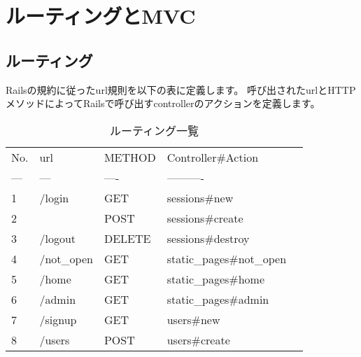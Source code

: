 \section{ルーティングとMVC}
\subsection{ルーティング}
Railsの規約に従ったurl規則を以下の表に定義します。
呼び出されたurlとHTTPメソッドによってRailsで呼び出すcontrollerのアクションを定義します。

\begin{table}[]
\centering
\caption{ルーティング一覧}
\label{my-label}
\begin{tabular}{lllll}
\cline{1-4}
\multicolumn{1}{|l|}{No.} & \multicolumn{1}{l|}{url}                 & \multicolumn{1}{l|}{METHOD} & \multicolumn{1}{l|}{Controller\#Action}       &  \\ \cline{1-4}
\multicolumn{1}{|l|}{---} & \multicolumn{1}{l|}{---}                 & \multicolumn{1}{l|}{----}   & \multicolumn{1}{l|}{----------}               &  \\ \cline{1-4}
\multicolumn{1}{|l|}{1}   & \multicolumn{1}{l|}{/login}              & \multicolumn{1}{l|}{GET}    & \multicolumn{1}{l|}{sessions\#new}            &  \\ \cline{1-4}
\multicolumn{1}{|l|}{2}   & \multicolumn{1}{l|}{}                    & \multicolumn{1}{l|}{POST}   & \multicolumn{1}{l|}{sessions\#create}         &  \\ \cline{1-4}
\multicolumn{1}{|l|}{3}   & \multicolumn{1}{l|}{/logout}             & \multicolumn{1}{l|}{DELETE} & \multicolumn{1}{l|}{sessions\#destroy}        &  \\ \cline{1-4}
\multicolumn{1}{|l|}{4}   & \multicolumn{1}{l|}{/not\_open}          & \multicolumn{1}{l|}{GET}    & \multicolumn{1}{l|}{static\_pages\#not\_open} &  \\ \cline{1-4}
\multicolumn{1}{|l|}{5}   & \multicolumn{1}{l|}{/home}               & \multicolumn{1}{l|}{GET}    & \multicolumn{1}{l|}{static\_pages\#home}      &  \\ \cline{1-4}
\multicolumn{1}{|l|}{6}   & \multicolumn{1}{l|}{/admin}              & \multicolumn{1}{l|}{GET}    & \multicolumn{1}{l|}{static\_pages\#admin}     &  \\ \cline{1-4}
\multicolumn{1}{|l|}{7}   & \multicolumn{1}{l|}{/signup}             & \multicolumn{1}{l|}{GET}    & \multicolumn{1}{l|}{users\#new}               &  \\ \cline{1-4}
\multicolumn{1}{|l|}{8}   & \multicolumn{1}{l|}{/users}              & \multicolumn{1}{l|}{POST}   & \multicolumn{1}{l|}{users\#create}            &  \\ \cline{1-4}

\end{tabular}
\end{table}
